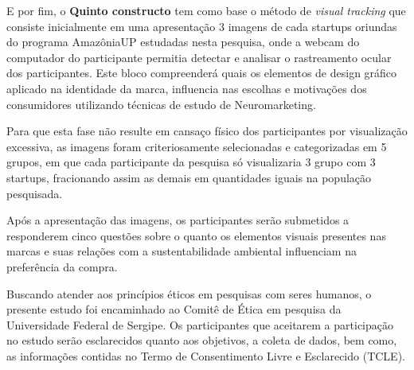 E por fim, o \textbf{Quinto constructo} tem como base o método de \textit{visual tracking} que consiste inicialmente em uma apresentação 3 imagens de cada startups oriundas do programa AmazôniaUP estudadas nesta pesquisa, onde a webcam do computador do participante permitia detectar e analisar o rastreamento ocular dos participantes. Este bloco compreenderá quais os elementos de design gráfico aplicado  na identidade da marca, influencia nas escolhas e motivações dos consumidores utilizando técnicas de estudo de Neuromarketing.

Para que esta fase não resulte em cansaço físico dos participantes por visualização excessiva, as imagens foram criteriosamente selecionadas e categorizadas em 5 grupos, em que cada participante da pesquisa só visualizaria 3 grupo com 3 startups, fracionando assim as demais em quantidades iguais na população pesquisada.

Após a apresentação das imagens, os participantes serão submetidos a responderem cinco questões sobre o quanto os elementos visuais presentes nas marcas e suas relações com a sustentabilidade ambiental influenciam na preferência da compra.

Buscando atender aos princípios éticos em pesquisas com seres humanos, o presente estudo foi encaminhado ao Comitê de Ética em pesquisa da Universidade Federal de Sergipe. Os participantes que aceitarem a participação no estudo serão esclarecidos quanto aos objetivos, a coleta de dados, bem como, as informações contidas no Termo de Consentimento Livre e Esclarecido (TCLE).






